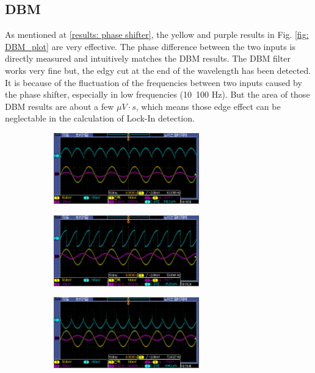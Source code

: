 \documentclass{article}
\begin{document}
\subsection{DBM}
As mentioned at \ref{results: phase shifter}, the yellow and purple results in Fig. \ref{fig: DBM_plot} are very effective.
The phase difference between the two inputs is directly measured and intuitively matches the DBM results.
The DBM filter works very fine but, the edgy cut at the end of the wavelength has been detected.
It is because of the fluctuation of the frequencies between two inputs caused by the phase shifter, especially in low frequencies (10~100 Hz).
But the area of those DBM results are about a few $\mu V \cdot s$, which means those edge effect can be neglectable in the calculation of Lock-In detection.


\begin{figure}[ht]
  \begin{subfigure}[b]{6.3cm}
      \centering
      \includegraphics[width=6.3cm]{../raw_data/TEK00355.PNG}
      \caption{}
  \end{subfigure}
  \hfill
  \begin{subfigure}[b]{6.3cm}
    \centering
    \includegraphics[width=6.3cm]{../raw_data/TEK00356.PNG}
    \caption{}
\end{subfigure}
\hfill
\begin{subfigure}[b]{6.3cm}
  \centering
  \includegraphics[width=6.3cm]{../raw_data/TEK00357.PNG}
  \caption{}
\end{subfigure}
\hfill

\end{figure}
\end{document}
